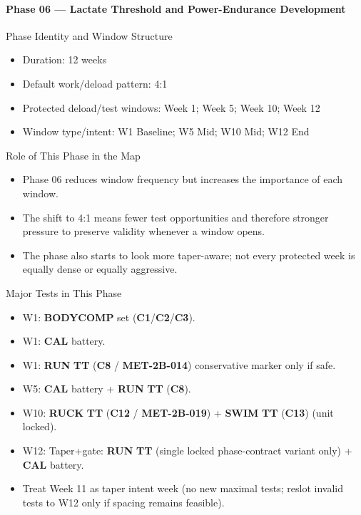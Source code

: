 \documentclass[10pt]{article}
\begin{document}
\newpage
\paragraph*{Phase 06 — Lactate Threshold and Power-Endurance Development}

Phase Identity and Window Structure

\begin{itemize}
\item Duration: 12 weeks
\item Default work/deload pattern: 4:1
\item Protected deload/test windows: Week 1; Week 5; Week 10; Week 12
\item Window type/intent: W1 Baseline; W5 Mid; W10 Mid; W12 End
\end{itemize}

Role of This Phase in the Map

\begin{itemize}
\item Phase 06 reduces window frequency but increases the importance of each window.
\item The shift to 4:1 means fewer test opportunities and therefore stronger pressure to preserve validity whenever a window opens.
\item The phase also starts to look more taper-aware; not every protected week is equally dense or equally aggressive.
\end{itemize}

Major Tests in This Phase

\begin{itemize}
\item W1: \textbf{BODYCOMP} set (\textbf{C1}/\textbf{C2}/\textbf{C3}).
\item W1: \textbf{CAL} battery.
\item W1: \textbf{RUN} \textbf{TT} (\textbf{C8} / \textbf{MET-2B-014}) conservative marker only if safe.
\item W5: \textbf{CAL} battery + \textbf{RUN} \textbf{TT} (\textbf{C8}).
\item W10: \textbf{RUCK} \textbf{TT} (\textbf{C12} / \textbf{MET-2B-019}) + \textbf{SWIM} \textbf{TT} (\textbf{C13}) (unit locked).
\item W12: Taper+gate: \textbf{RUN} \textbf{TT} (single locked phase-contract variant only) + \textbf{CAL} battery.
\item Treat Week 11 as taper intent week (no new maximal tests; reslot invalid tests to W12 only if spacing remains feasible).
\end{itemize}
\end{document}
